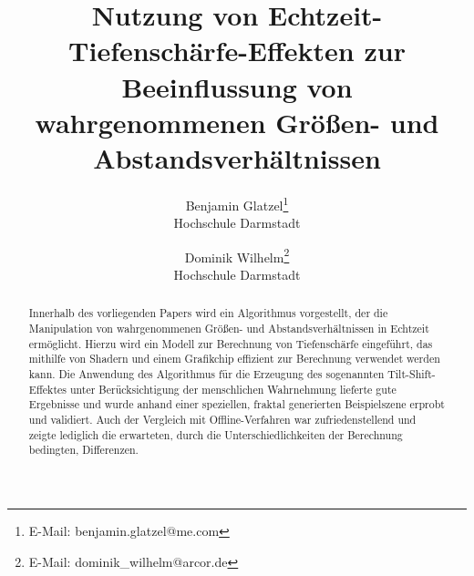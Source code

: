 \documentclass{acmsiggraph}                     %
\title{Nutzung von Echtzeit-Tiefenschärfe-Effekten zur Beeinflussung von wahrgenommenen Größen- und Abstandsverhältnissen}
\author{Benjamin Glatzel\thanks{E-Mail: benjamin.glatzel@me.com}\\ Hochschule Darmstadt
\and Dominik Wilhelm\thanks{E-Mail: dominik\_wilhelm@arcor.de}\\ Hochschule Darmstadt}
\begin{document}

\maketitle

\def\abstractname{Abstract}
\begin{abstract}

Innerhalb des vorliegenden Papers wird ein Algorithmus vorgestellt, der die Manipulation von wahrgenommenen Größen- und Abstandsverhältnissen in Echtzeit ermöglicht. Hierzu wird ein Modell zur Berechnung von Tiefenschärfe eingeführt, das mithilfe von Shadern und einem Grafikchip effizient zur Berechnung verwendet werden kann. Die Anwendung des Algorithmus für die Erzeugung des sogenannten Tilt-Shift-Effektes unter Berücksichtigung der menschlichen Wahrnehmung lieferte gute Ergebnisse und wurde anhand einer speziellen, fraktal generierten Beispielszene erprobt und validiert. Auch der Vergleich mit Offline-Verfahren war zufriedenstellend und zeigte lediglich die erwarteten, durch die Unterschiedlichkeiten der Berechnung bedingten, Differenzen.



\end{abstract}
\end{document}
